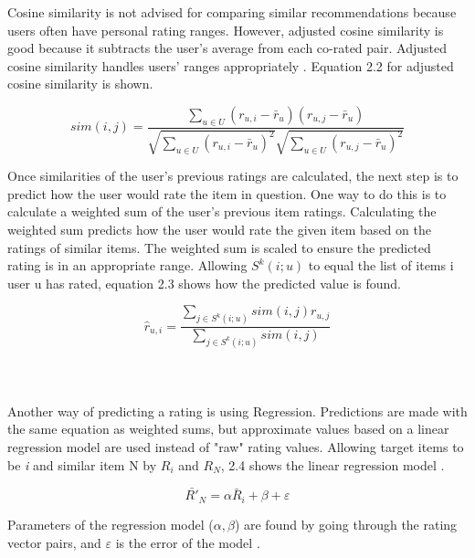 Cosine similarity is not advised for comparing similar recommendations because users often have personal rating ranges. However, adjusted cosine similarity is good because it subtracts the user's average from each co-rated pair. Adjusted cosine similarity handles users' ranges appropriately \citep{sarwar_item-based_2001}. Equation 2.2 for adjusted cosine similarity is shown.

\begin{equation}
	sim(i , j) = \frac{ \sum_{ u \in U } ( r _{ u, i } - \bar{r} _{u} ) ( r _{ u, j} - \bar{r} _{u} ) } { \sqrt{\sum_{ u \in U } ( r _{ u, i } - \bar{r} _{u} )^2} \sqrt{\sum_{ u \in U } ( r _{ u, j } - \bar{r} _{u} )^2}}
\end{equation}

Once similarities of the user's previous ratings are calculated, the next step is to predict how the user would rate the item in question. One way to do this is to calculate a weighted sum of the user's previous item ratings. Calculating the weighted sum predicts how the user would rate the given item based on the ratings of similar items. The weighted sum is scaled to ensure the predicted rating is in an appropriate range\citep{sarwar_item-based_2001}. Allowing $ S^{k}(i;u)$ to equal the list of items i user u has rated, equation 2.3 shows how the predicted value is found.

\begin{equation}
	\hat{r} _{u,i} = \frac{ \sum _{ j \in S^{k}(i;u)} sim(i , j) r _{u, j}}{\sum _{j \in S^{k}(i;u)} sim(i , j)}
\end{equation}
\\
\\
\\
Another way of predicting a rating is using Regression. Predictions are made with the same equation as weighted sums, but approximate values based on a linear regression model are used instead of "raw" rating values. Allowing target items to be \textit{i} and similar item N by $R_{i}$ and $R_{N}$, 2.4 shows the linear regression model \citep{sarwar_item-based_2001}.

\begin{equation}
	\bar{R'} _{N} = \alpha \bar{R}_{i} + \beta + \varepsilon
\end{equation}

Parameters of the regression model ($\alpha , \beta$) are found by going through the rating vector pairs, and $\varepsilon$ is the error of the model \citep{sarwar_item-based_2001}.

